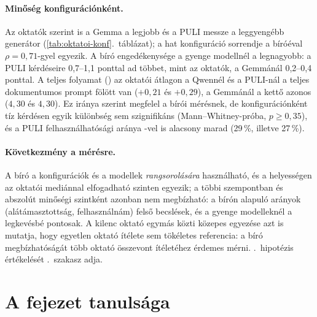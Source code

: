 \paragraph{Minőség konfigurációnként.} Az oktatók szerint is a Gemma a legjobb és a PULI messze a
leggyengébb generátor (\ref{tab:oktatoi-konf}.~táblázat); a hat konfiguráció sorrendje a bíróéval
$\rho=0{,}71$-gyel egyezik. A bíró engedékenysége a gyenge modellnél a legnagyobb: a PULI kérdéseire
0,7--1,1 ponttal ad többet, mint az oktatók, a Gemmánál 0,2--0,4 ponttal. A teljes folyamat () az
oktatói átlagon a Qwennél és a PULI-nál a teljes dokumentumos prompt fölött van ($+0{,}21$ és $+0{,}29$), a
Gemmánál a kettő azonos ($4{,}30$ és $4{,}30$). Ez iránya szerint megfelel a bírói mérésnek, de
konfigurációnként tíz kérdésen egyik különbség sem szignifikáns (Mann--Whitney-próba, $p\ge0{,}35$), és a
PULI felhasználhatósági aránya -vel is alacsony marad (29\,\%, illetve 27\,\%).

\paragraph{Következmény a mérésre.} A bíró a konfigurációk és a modellek \emph{rangsorolására}
használható, és a helyességen az oktatói mediánnal elfogadható szinten egyezik; a többi szempontban és
abszolút minőségi szintként azonban nem megbízható: a bírón alapuló arányok (alátámasztottság,
felhasználnám) felső becslések, és a gyenge modelleknél a legkevésbé pontosak. A kilenc oktató egymás közti
közepes egyezése azt is mutatja, hogy egyetlen oktató ítélete sem tökéletes referencia: a bíró
megbízhatóságát több oktató összevont ítéletéhez érdemes mérni. \Az{\ref{h:meres}}.~hipotézis értékelését
\az{\ref{sec:hipotezis-ertekeles}}.~szakasz adja.

\section{A fejezet tanulsága}
\label{sec:eredmenyek-tanulsag}

